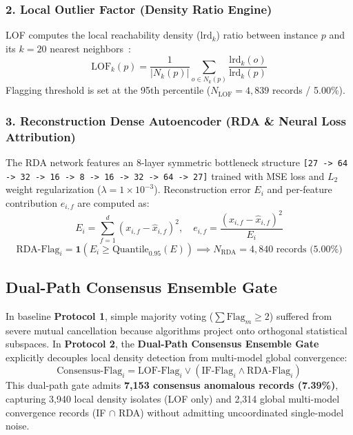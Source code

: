 \documentclass[runningheads]{llncs}
\begin{document}
\subsubsection{2. Local Outlier Factor (Density Ratio Engine)}
LOF computes the local reachability density ($\text{lrd}_k$) ratio between instance $p$ and its $k=20$ nearest neighbors~\cite{ref24}:
\begin{equation}
\text{LOF}_k(p) = \frac{1}{|N_k(p)|} \sum_{o \in N_k(p)} \frac{\text{lrd}_k(o)}{\text{lrd}_k(p)}
\end{equation}
Flagging threshold is set at the 95th percentile ($N_{\text{LOF}} = 4,839$ records / 5.00\%).

\subsubsection{3. Reconstruction Dense Autoencoder (RDA \& Neural Loss Attribution)}
The RDA network features an 8-layer symmetric bottleneck structure \texttt{[27 -> 64 -> 32 -> 16 -> 8 -> 16 -> 32 -> 64 -> 27]} trained with MSE loss and $L_2$ weight regularization ($\lambda = 1\times 10^{-3}$). Reconstruction error $E_i$ and per-feature contribution $e_{i,f}$ are computed as:
\begin{equation}
E_i = \sum_{f=1}^{d} (x_{i,f} - \hat{x}_{i,f})^2, \quad e_{i,f} = \frac{(x_{i,f} - \hat{x}_{i,f})^2}{E_i}
\end{equation}
\begin{equation}
\text{RDA-Flag}_i = \mathbf{1}\left(E_i \ge \text{Quantile}_{0.95}(E)\right) \implies N_{\text{RDA}} = 4,840 \text{ records (5.00\%)}
\end{equation}

\subsection{Dual-Path Consensus Ensemble Gate}
In baseline \textbf{Protocol 1}, simple majority voting ($\sum \text{Flag}_m \ge 2$) suffered from severe mutual cancellation because algorithms project onto orthogonal statistical subspaces. In \textbf{Protocol 2}, the \textbf{Dual-Path Consensus Ensemble Gate} explicitly decouples local density detection from multi-model global convergence:
\begin{equation}
\text{Consensus-Flag}_i = \text{LOF-Flag}_i \lor \left(\text{IF-Flag}_i \land \text{RDA-Flag}_i\right)
\end{equation}
This dual-path gate admits \textbf{7,153 consensus anomalous records (7.39\%)}, capturing 3,940 local density isolates (LOF only) and 2,314 global multi-model convergence records (IF $\cap$ RDA) without admitting uncoordinated single-model noise.
\end{document}
